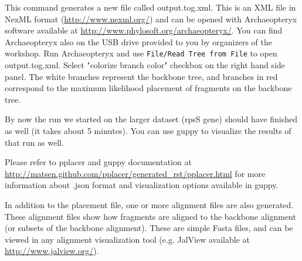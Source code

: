 \documentclass[11pt]{article} %
\newcommand{\ins}[1]{{\tt #1}}
\newcommand{\file}[1]{{\sf #1}}
\newcommand{\pplacer}{pplacer\xspace}
\newcommand{\guppy}{guppy\xspace}
\newcommand{\arch}{Archaeopteryx\xspace}
\begin{document}
This command generates a new file called \file{output.tog.xml}. This is an XML file in NexML format (\url{http://www.nexml.org/}) and can be opened with \arch software {available at \url{http://www.phylosoft.org/archaeopteryx/}}. You can find \arch also on the USB drive provided to you by organizers of the workshop. Run \arch and use \ins{File/Read Tree from File} to open \file{output.tog.xml}. Select "colorize branch color" checkbox on the right hand side panel. The white branches represent the backbone tree, and branches in red correspond to the maximum likelihood placement of fragments on the backbone tree. 

By now the run we started on the larger dataset (rpsS gene) should have finished as well (it takes about 5 minutes). You can use \guppy to visualize the results of that run as well. 

Please refer to \pplacer and \guppy documentation at \url{http://matsen.github.com/pplacer/generated_rst/pplacer.html} for more information about \file{.json} format and visualization options available in \guppy. 

In addition to the placement file, one or more alignment files are also generated. These alignment files show how fragments are aligned to the backbone alignment (or subsets of the backbone alignment). These are simple Fasta files, and can be viewed in any alignment visualization tool (e.g. JalView available at \url{http://www.jalview.org/}). 




\end{document}

